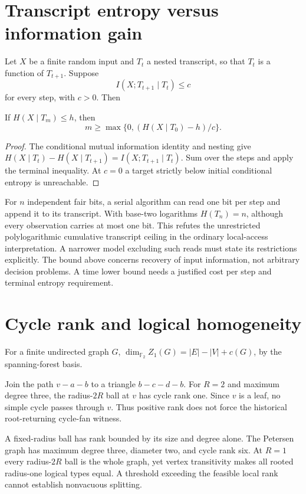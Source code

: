 \section{Transcript entropy versus information gain}
Let $X$ be a finite random input and $T_t$ a nested transcript, so that $T_t$ is a function of $T_{t+1}$. Suppose
\[
I(X;T_{t+1}\mid T_t)\le c
\]
for every step, with $c>0$. Then
\begin{theorem}
If $H(X\mid T_m)\le h$, then
\[
m\ge \max\{0,(H(X\mid T_0)-h)/c\}.
\]
\end{theorem}
\begin{proof}
The conditional mutual information identity and nesting give
$H(X\mid T_t)-H(X\mid T_{t+1})=I(X;T_{t+1}\mid T_t)$.
Sum over the steps and apply the terminal inequality. At $c=0$ a target strictly below initial conditional entropy is unreachable.
\end{proof}
For $n$ independent fair bits, a serial algorithm can read one bit per step and append it to its transcript. With base-two logarithms $H(T_n)=n$, although every observation carries at most one bit. This refutes the unrestricted polylogarithmic cumulative transcript ceiling in the ordinary local-access interpretation. A narrower model excluding such reads must state its restrictions explicitly. The bound above concerns recovery of input information, not arbitrary decision problems. A time lower bound needs a justified cost per step and terminal entropy requirement.

\section{Cycle rank and logical homogeneity}
For a finite undirected graph $G$, $\dim_{\mathbb F_2} Z_1(G)=|E|-|V|+c(G)$, by the spanning-forest basis.
\begin{example}
Join the path $v-a-b$ to a triangle $b-c-d-b$. For $R=2$ and maximum degree three, the radius-$2R$ ball at $v$ has cycle rank one. Since $v$ is a leaf, no simple cycle passes through $v$. Thus positive rank does not force the historical root-returning cycle-fan witness.
\end{example}
A fixed-radius ball has rank bounded by its size and degree alone. The Petersen graph has maximum degree three, diameter two, and cycle rank six. At $R=1$ every radius-$2R$ ball is the whole graph, yet vertex transitivity makes all rooted radius-one logical types equal. A threshold exceeding the feasible local rank cannot establish nonvacuous splitting.

